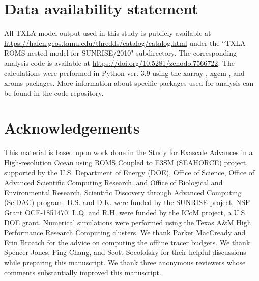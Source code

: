 \section*{Data availability statement} 
All TXLA model output used in this study is publicly available at \url{https://hafen.geos.tamu.edu/thredds/catalog/catalog.html} under the ``TXLA ROMS nested model for SUNRISE/2010" subdirectory. The corresponding analysis code is available at \url{https://doi.org/10.5281/zenodo.7566722}. The calculations were performed in Python ver. 3.9 using the xarray \citep{hoyer_stephan_2021_5771208}, xgcm \citep{abernathey_ryan_p_2022_6643579}, and xroms \citep{xroms} packages. More information about specific packages used for analysis can be found in the code repository. 

\section*{Acknowledgements}
This material is based upon work done in the Study for Exascale Advances in a High-resolution Ocean using ROMS Coupled to E3SM (SEAHORCE) project, supported by the U.S. Department of Energy (DOE), Office of Science, Office of Advanced Scientific Computing Research, and Office of Biological and Environmental Research, Scientific Discovery through Advanced Computing (SciDAC) program. D.S. and D.K. were funded by the SUNRISE project, NSF Grant OCE-1851470. L.Q. and R.H. were funded by the ICoM project, a U.S. DOE grant. Numerical simulations were performed using the Texas A\&M High Performance Research Computing clusters. We thank Parker MacCready and Erin Broatch for the advice on computing the offline tracer budgets. We thank Spencer Jones, Ping Chang, and Scott Socolofsky for their helpful discussions while preparing this manuscript. We thank three anonymous reviewers whose comments substantially improved this manuscript.
% 
% 
